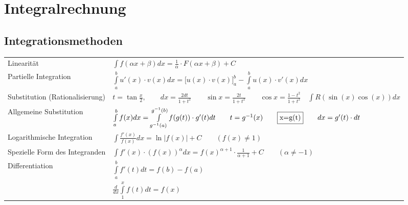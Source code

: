 \section{Integralrechnung }
\subsection{Integrationsmethoden }
  
  \begin{tabular}{ll}
    Linearit\"at & $\int{f(\alpha x+\beta )dx=\frac{1}{\alpha}\cdot F(\alpha x+\beta)+C}$ \\
    Partielle Integration & $\int\limits_a^b{u'(x)\cdot v(x)dx}=\biggl[
    u(x)\cdot v(x) \biggr]_a^b-\int\limits_a^b{u(x)\cdot v'(x)dx}$\\
    Substitution (Rationalisierung) & $t=\tan\frac{x}{2}, \qquad
    dx=\frac{2dt}{1+t^2} \qquad \sin  x=\frac{2t}{1+t^2} \qquad \cos x=\frac{1-t^2}{1+t^2}
    \quad\int{R(\sin(x)\cos(x))dx}$\\
    Allgemeine Substitution &
    $\int\limits_{a}^{b}{f(x)dx}=\int\limits_{g^{-1}(a)}^{g^{-1}(b)}{f(g(t))\cdot
    g'(t)dt}\qquad t=g^{-1}(x)\qquad  \fbox{x=g(t)}\qquad dx=g'(t)\cdot dt$\\
    Logarithmische Integration & $\int{\frac{f'(x)}{f(x)}dx}=\ln|f(x)|+C 
    \qquad{(f(x)\neq 1)}$\\
    Spezielle Form des Integranden & $\int{f'(x)\cdot (f(x))^{\alpha} dx}=
    f(x)^{\alpha +1}\cdot \frac{1}{\alpha+1}+C
    \qquad{(\alpha \neq -1)}$\\
    Differentiation & $\int \limits ^{b} _{a} {f'(t)dt}=f(b)-f(a)$\\
    & $\frac{d}{dx} \int \limits ^{x} _{1} {f(t)dt}=f(x)$
  \end{tabular}
  
  

